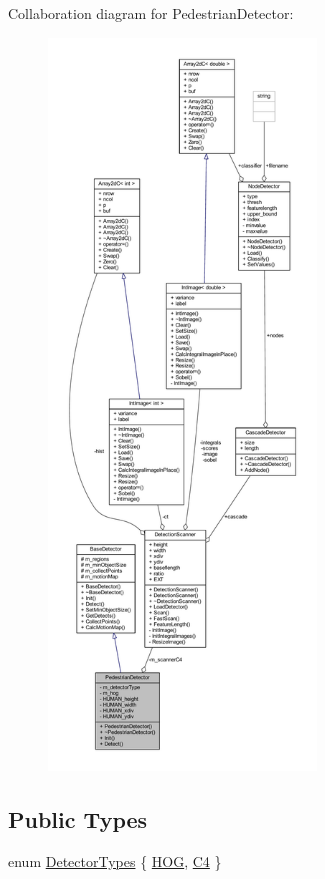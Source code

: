 Collaboration diagram for Pedestrian\+Detector\+:\nopagebreak
\begin{figure}[H]
\begin{center}
\leavevmode
\includegraphics[height=550pt]{class_pedestrian_detector__coll__graph}
\end{center}
\end{figure}
\subsection*{Public Types}
\begin{DoxyCompactItemize}
\item 
enum \mbox{\hyperlink{class_pedestrian_detector_aa2136624089c144b4ef5f3598de00d8c}{Detector\+Types}} \{ \mbox{\hyperlink{class_pedestrian_detector_aa2136624089c144b4ef5f3598de00d8ca47cb01f997c4439468112272761fc7de}{H\+OG}}, 
\mbox{\hyperlink{class_pedestrian_detector_aa2136624089c144b4ef5f3598de00d8ca408a85378caa7239ba0ded11495782fd}{C4}}
 \}
\end{DoxyCompactItemize}
